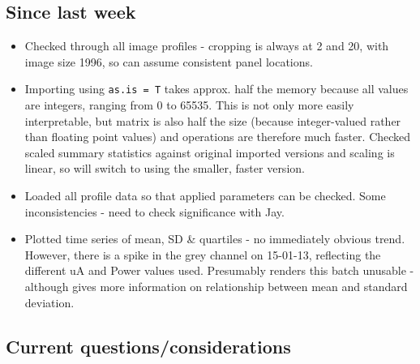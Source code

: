 \documentclass[10pt,fleqn]{article}
\begin{document}
\subsection*{Since last week}

\begin{itemize}

\item
Checked through all image profiles - cropping is always at 2 and 20, with image size 1996, so can assume consistent panel locations.

\item
Importing using \texttt{as.is = T} takes approx. half the memory because all values are integers, ranging from 0 to 65535. This is not only more easily interpretable, but matrix is also half the size (because integer-valued rather than floating point values) and operations are therefore much faster. Checked scaled summary statistics against original imported versions and scaling is linear, so will switch to using the smaller, faster version.

\item
Loaded all profile data so that applied parameters can be checked. Some inconsistencies - need to check significance with Jay.

\item
Plotted time series of mean, SD \& quartiles - no immediately obvious trend.\\
However, there is a spike in the grey channel on 15-01-13, reflecting the different uA and Power values used. Presumably renders this batch unusable - although gives more information on relationship between mean and standard deviation.

\end{itemize}

\subsection*{Current questions/considerations}
\end{document}
